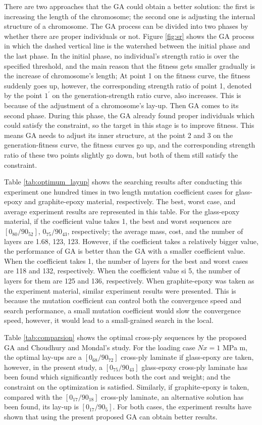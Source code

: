There are two approaches that the GA could obtain a better solution: the first
is increasing the length of the chromosome; the second one is adjusting the
internal structure of a chromosome. The GA process can be divided into two
phases by whether there are proper individuals or not. Figure
\ref{fig:sr} shows the GA process in which the dashed vertical line is the
watershed between the initial phase and the last phase. In the initial phase,
no individual's strength ratio is over the specified threshold, and the main
reason that the fitness gets smaller gradually is the increase of chromosome's
length; At point 1 on the fitness curve, the fitness suddenly goes up, however,
the corresponding strength ratio of point 1, denoted by the point $1^{\prime}$
on the generation-strength ratio curve, also increases. This is because of the
adjustment of a chromosome's lay-up.  Then GA comes to its second phase. During
this phase, the GA already found proper individuals which could satisfy the
constraint, so the target in this stage is to improve fitness. This means GA
needs to adjust its inner structure, at the point 2 and 3 on the
generation-fitness curve, the fitness curves go up, and the corresponding
strength ratio of these two points slightly go down, but both of them still
satisfy the constraint.



Table \ref{tab:optimum_layup} shows the searching results after conducting this
experiment one hundred times in two length mutation coefficient cases for
glass-epoxy and graphite-epoxy material, respectively. The best, worst case, and
average experiment results are represented in this table. For the glass-epoxy
material, if the coefficient value takes 1, the best and worst sequences are
$[0_{80}/90_{52}]$, $0_{75}/90_{43}$, respectively; the average mass, cost, and
the number of layers are 1.68, 123, 123. However, if the coefficient takes a
relatively bigger value, the performance of GA is better than the GA with a smaller
coefficient value. When the coefficient takes 1, the number of layers for the
best and worst cases are 118 and 132, respectively. When the coefficient value
si 5, the number of layers for them are 125 and 136, respectively. When
graphite-epoxy was taken as the experiment material, similar experiment
results were presented. This is because the mutation coefficient can control
both the convergence speed and search performance, a small mutation coefficient
would slow the convergence speed, however, it would lead to a small-grained
search in the local. 



Table \ref{tab:comparsion} shows the optimal cross-ply sequences by the proposed GA
and  Choudhury and Mondal's\cite{choudhury2019failure} study. For the loading
case $Nx=1$ MPa m, the optimal lay-ups are a $[0_{68}/90_{72}]$  cross-ply
laminate if glass-epoxy are taken, however, in the present study, a
$[0_{75}/90_{43}]$ glass-epoxy cross-ply laminate has been found which
significantly reduces both the cost and weight; and the constraint on the
optimization is satisfied.  Similarly, if graphite-epoxy is taken, compared
with the $[0_{17}/90_{18}]$ cross-ply laminate, an alternative solution has
been found, its lay-up is $[0_{17}/90_5]$. For both cases, the experiment
results have shown that using the present proposed GA can obtain better results.
